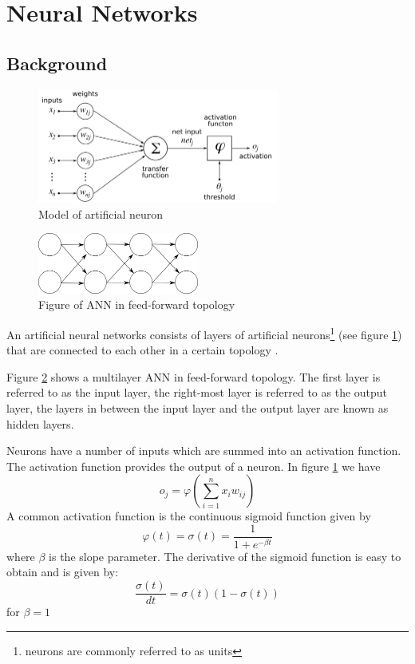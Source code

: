 
\section{Neural Networks}
\subsection{Background}
\begin{figure}[h!]
\center
\includegraphics[width=300px]{../images/ANN_neuron.png}
\caption{Model of artificial neuron}
\label{ims:ANN_neuron}
\end{figure}
\begin{figure}
\centerline{\includegraphics[width=200px]{../images/ANN_feedforward.png}}
\caption{Figure of ANN in feed-forward topology}
\label{ims:ANN_FF}
\end{figure}
An artificial neural networks consists of layers of artificial neurons\footnote{neurons are commonly referred to as units} (see figure \ref{ims:ANN_neuron}) that are connected to each other in a certain topology \cite{bishop1995neural}.

Figure \ref{ims:ANN_FF} shows a multilayer ANN in feed-forward topology. The first layer is referred to as the input layer, the right-most layer is referred to as the output layer, the layers in between the input layer and the output layer are known as hidden layers.

Neurons have a number of inputs which are summed into an activation function. The activation function provides the output of a neuron.
In figure \ref{ims:ANN_neuron} we have
\[ o_j = \varphi\left(\sum^{n}_{i=1} x_i w_{ij}\right)  \]
A common activation function is the continuous sigmoid function given by
\begin{equation} \varphi(t) = \sigma(t) = \frac{1}{1+e^{-\beta t}}  \label{eq:sigmoid}\end{equation}
where $\beta$ is the slope parameter.
The derivative of the sigmoid function is easy to obtain and is given by:
\begin{equation} \frac{\sigma(t)}{dt} = \sigma(t)(1-\sigma(t))\label{eq:sigmoidd}\end{equation}
for $\beta=1$

